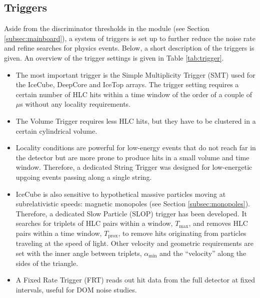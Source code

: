 \subsection{Triggers}
\label{subsec:triggers}
Aside from the discriminator thresholds in the module (see Section \ref{subsec:mainboard}), a system of triggers is set up to further reduce the noise rate and refine searches for physics events. Below, a short description of the triggers is given. An overview of the trigger settings is given in Table \ref{tab:trigger}. 

\vspace{2mm}
\begin{itemize}
\item The most important trigger is the Simple Multiplicity Trigger (SMT) used for the IceCube, DeepCore and IceTop arrays. The trigger setting requires a certain number of HLC hits within a time window of the order of a couple of $\mu$s without any locality requirements.
\item The Volume Trigger requires less HLC hits, but they have to be clustered in a certain cylindrical volume. 
\item Locality conditions are powerful for low-energy events that do not reach far in the detector but are more prone to produce hits in a small volume and time window. Therefore, a dedicated String Trigger was designed for low-energetic upgoing events passing along a single string. 
\item IceCube is also sensitive to hypothetical massive particles moving at subrelativistic speeds: magnetic monopoles (see Section \ref{subsec:monopoles}). Therefore, a dedicated Slow Particle (SLOP) trigger has been developed. It searches for triplets of HLC pairs within a window, $T_{\textrm{max}}$, and removes HLC pairs within a time window, $T_{\textrm{prox}}$, to remove hits originating from particles traveling at the speed of light. Other velocity and geometric requirements are set with the inner angle between triplets, $\alpha_{\textrm{min}}$ and the ``velocity'' along the sides of the triangle.
\item A Fixed Rate Trigger (FRT) reads out hit data from the full detector at fixed intervals, useful for DOM noise studies.
\end{itemize}
\vspace{2mm}

